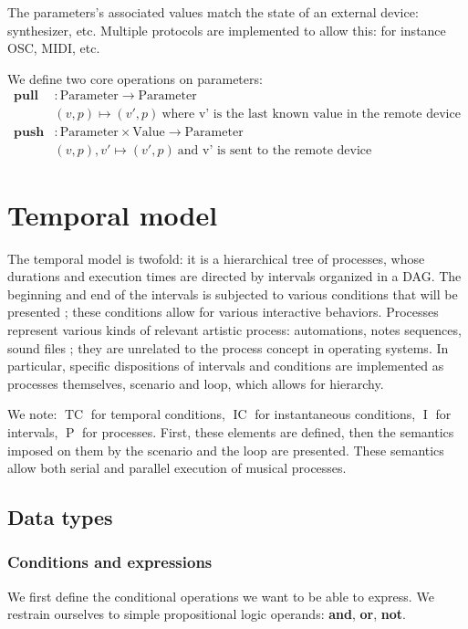 \documentclass{article}
\DeclareMathOperator{\tc}{TC}
\DeclareMathOperator{\ic}{IC}
\DeclareMathOperator{\itv}{I}
\DeclareMathOperator{\proc}{P}
\begin{document}
The parameters's associated values match the state of an external device: synthesizer, etc.
Multiple protocols are implemented to allow this: for instance OSC, MIDI, etc.

We define two core operations on parameters: 
\begin{align*}
\mathbf{pull} & : \mathrm{Parameter} \rightarrow \mathrm{Parameter} \\
              & (v, p) \mapsto (v', p)~\text{where v' is the last known value in the remote device}\\
\mathbf{push} &: \mathrm{Parameter} \times \mathrm{Value} \rightarrow \mathrm{Parameter} \\
              & (v, p), v' \mapsto (v', p)~\text{and v' is sent to the remote device} 
\end{align*}

\section{Temporal model}\label{sec.temporal}
The temporal model is twofold: it is a hierarchical tree of processes, whose durations and execution times are directed by intervals organized in a \ac{DAG}. 
The beginning and end of the intervals is subjected to various conditions that will be presented ; these conditions allow for various 
interactive behaviors. Processes represent various kinds of relevant artistic process: automations, notes sequences, sound files ; they are unrelated to the process concept in operating systems. 
In particular, specific dispositions of intervals and conditions are implemented as processes themselves, scenario and loop, which allows for hierarchy.

We note: $\tc$ for temporal conditions, $\ic$ for instantaneous conditions, $\itv$ for intervals, $\proc$ for processes. 
First, these elements are defined, then the semantics imposed on them by the scenario and the loop are presented.
These semantics allow both serial and parallel execution of musical processes.

\subsection{Data types}   
    
\subsubsection{Conditions and expressions}
We first define the conditional operations we want to be able to express.
We restrain ourselves to simple propositional logic operands: \textbf{and}, \textbf{or}, \textbf{not}.
\end{document}
